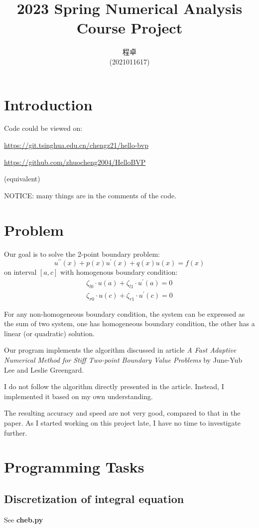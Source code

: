 \documentclass{article}
\title{
    {2023 Spring Numerical Analysis Course Project}
}
\author{\begin{Chinese}程卓\end{Chinese} (2021011617)}
\begin{document}
\maketitle

\tableofcontents

\section{Introduction}
Code could be viewed on:

\url{https://git.tsinghua.edu.cn/chengz21/hello-bvp}

\url{https://github.com/zhuocheng2004/HelloBVP}

(equivalent)

\bigskip

NOTICE: many things are in the comments of the code.

\section{Problem}
Our goal is to solve the 2-point boundary problem:
$$
    u^{\prime\prime}(x) + p(x)u^\prime(x) + q(x)u(x) = f(x)
$$
on interval $[a, c]$
with homogenous boundary condition:
\begin{align}
    \zeta_{l0} \cdot u(a) + \zeta_{l1} \cdot u^\prime(a) = 0 \\
    \zeta_{r0} \cdot u(c) + \zeta_{r1} \cdot u^\prime(c) = 0
\end{align}


For any non-homogeneous boundary condition, 
the system can be expressed as the sum of two system, 
one has homogeneous boundary condition, 
the other has a linear (or quadratic) solution.

Our program implements the algorithm discussed in article 
{\sl A Fast Adaptive Numerical Method for Stiff Two-point Boundary Value Problems}
by June-Yub Lee and Leslie Greengard.

I do not follow the algorithm directly presented in the article. 
Instead, I implemented it based on my own understanding.

The resulting accuracy and speed are not very good, compared to that in the paper.
As I started working on this project late,
I have no time to investigate further.

\section{Programming Tasks}
\subsection{Discretization of integral equation}
See {\bf cheb.py}
\end{document}
